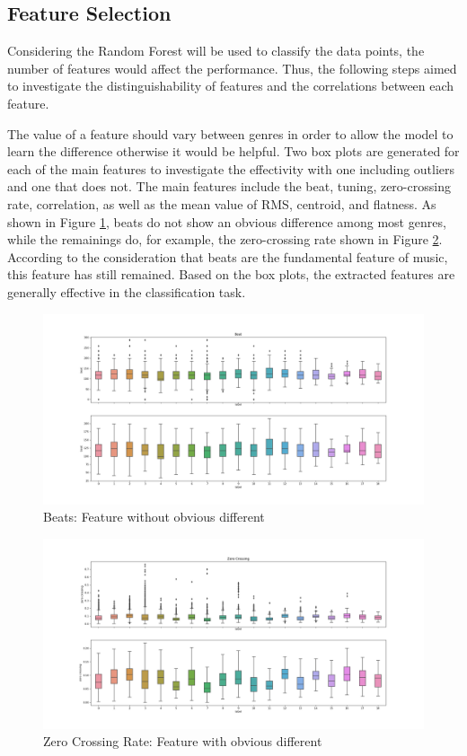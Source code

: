 \documentclass[sigconf ,nonacm]{acmart}
\begin{document}
\subsection{Feature Selection}
Considering the Random Forest will be used to classify the data points, the number of features would affect the performance. Thus, the following steps aimed to investigate the distinguishability of features and the correlations between each feature.

The value of a feature should vary between genres in order to allow the model to learn the difference otherwise it would be helpful. Two box plots are generated for each of the main features to investigate the effectivity with one including outliers and one that does not. The main features include the beat, tuning, zero-crossing rate, correlation, as well as the mean value of RMS, centroid, and flatness. As shown in Figure \ref{fig:beat}, beats do not show an obvious difference among most genres, while the remainings do, for example, the zero-crossing rate shown in Figure \ref{fig:zero crossing}. According to the consideration that beats are the fundamental feature of music, this feature has still remained. Based on the box plots, the extracted features are generally effective in the classification task. 

\begin{figure}[b]
  \includegraphics[width=\columnwidth]{../figures/Beat.png}
  \caption{Beats: Feature without obvious different}
  \label{fig:beat}
\end{figure}
\begin{figure}[b]
  \includegraphics[width=\columnwidth]{../figures/Zero Crossing.png}
  \caption{Zero Crossing Rate:  Feature with obvious different}
  \label{fig:zero crossing}
\end{figure}
\end{document}
